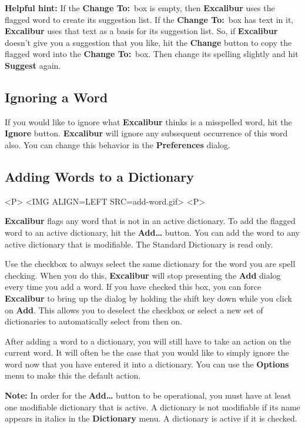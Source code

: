 \documentclass[11pt,titlepage]{article}
\newcommand{\ex}{\textbf{Excalibur}}
\begin{document}
\textbf{Helpful hint:} If the \textbf{Change To:}\ box is empty, then
\ex{} uses the flagged word to create its suggestion list. If the
\textbf{Change To:}\ box has text in it, \ex{} uses that text as a
basis for its suggestion list. So, if \ex{} doesn't give you a
suggestion that you like, hit the \textbf{Change} button to copy the
flagged word into the \textbf{Change To:}\ box. Then change its
spelling slightly and hit \textbf{Suggest} again.

\subsection{Ignoring a Word}

If you would like to ignore what \ex{} thinks is a misspelled word,
hit the \textbf{Ignore} button. \ex{} will ignore any subsequent
occurrence of this word also. You can change this behavior in the
\textbf{Preferences} dialog.

\subsection{Adding Words to a Dictionary}

\begin{rawhtml}
<P>
<IMG ALIGN=LEFT SRC=add-word.gif>
<P>
\end{rawhtml}

\ex{} flags any word that is not in an active dictionary. To add the
flagged word to an active dictionary, hit the \textbf{Add\ldots}
button.  You can add the word to any active dictionary that is
modifiable.  The Standard Dictionary is read only.

Use the checkbox to always select the same dictionary for the word you
are spell checking. When you do this, \ex{} will stop presenting the
\textbf{Add} dialog every time you add a word. If you have checked
this box, you can force \ex{} to bring up the dialog by holding the
shift key down while you click on \textbf{Add}. This allows you to
deselect the checkbox or select a new set of dictionaries to
automatically select from then on.

After adding a word to a dictionary, you will still have to take an
action on the current word. It will often be the case that you would
like to simply ignore the word now that you have entered it into a
dictionary. You can use the \textbf{Options} menu to make this the
default action.

\textbf{Note:} In order for the \textbf{Add\ldots} button to be
operational, you must have at least one modifiable dictionary that is
active.  A dictionary is not modifiable if its name appears in italics
in the \textbf{Dictionary} menu.  A dictionary is active if it is
checked.
\end{document}
